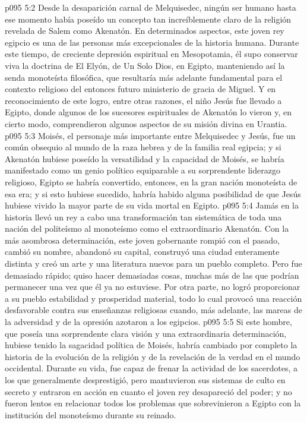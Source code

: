 \vs p095 5:2 Desde la desaparición carnal de Melquisedec, ningún ser humano hasta ese momento había poseído un concepto tan increíblemente claro de la religión revelada de Salem como Akenatón. En determinados aspectos, este joven rey egipcio es una de las personas más excepcionales de la historia humana. Durante este tiempo, de creciente depresión espiritual en Mesopotamia, él supo conservar viva la doctrina de El Elyón, de Un Solo Dios, en Egipto, manteniendo así la senda monoteísta filosófica, que resultaría más adelante fundamental para el contexto religioso del entonces futuro ministerio de gracia de Miguel. Y en reconocimiento de este logro, entre otras razones, el niño Jesús fue llevado a Egipto, donde algunos de los sucesores espirituales de Akenatón lo vieron y, en cierto modo, comprendieron algunos aspectos de su misión divina en Urantia.
\vs p095 5:3 Moisés, el personaje más importante entre Melquisedec y Jesús, fue un común obsequio al mundo de la raza hebrea y de la familia real egipcia; y si Akenatón hubiese poseído la versatilidad y la capacidad de Moisés, se habría manifestado como un genio político equiparable a su sorprendente liderazgo religioso, Egipto se habría convertido, entonces, en la gran nación monoteísta de esa era; y si esto hubiese sucedido, habría habido alguna posibilidad de que Jesús hubiese vivido la mayor parte de su vida mortal en Egipto.
\vs p095 5:4 Jamás en la historia llevó un rey a cabo una transformación tan sistemática de toda una nación del politeísmo al monoteísmo como el extraordinario Akenatón. Con la más asombrosa determinación, este joven gobernante rompió con el pasado, cambió su nombre, abandonó su capital, construyó una ciudad enteramente distinta y creó un arte y una literatura nuevos para un pueblo completo. Pero fue demasiado rápido; quiso hacer demasiadas cosas, muchas más de las que podrían permanecer una vez que él ya no estuviese. Por otra parte, no logró proporcionar a su pueblo estabilidad y prosperidad material, todo lo cual provocó una reacción desfavorable contra sus enseñanzas religiosas cuando, más adelante, las mareas de la adversidad y de la opresión azotaron a los egipcios.
\vs p095 5:5 Si este hombre, que poseía una sorprendente clara visión y una extraordinaria determinación, hubiese tenido la sagacidad política de Moisés, habría cambiado por completo la historia de la evolución de la religión y de la revelación de la verdad en el mundo occidental. Durante su vida, fue capaz de frenar la actividad de los sacerdotes, a los que generalmente desprestigió, pero mantuvieron sus sistemas de culto en secreto y entraron en acción en cuanto el joven rey desapareció del poder; y no fueron lentos en relacionar todos los problemas que sobrevinieron a Egipto con la institución del monoteísmo durante su reinado.
